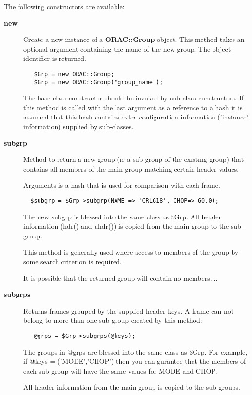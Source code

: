 The following constructors are available:

\begin{description}
\item[\textbf{new}] \mbox{}

Create a new instance of a \textbf{ORAC::Group} object.
This method takes an optional argument containing the
name of the new group. The object identifier is returned.

\begin{verbatim}
   $Grp = new ORAC::Group;
   $Grp = new ORAC::Group("group_name");
\end{verbatim}


The base class constructor should be invoked by sub-class constructors.
If this method is called with the last argument as a reference to
a hash it is assumed that this hash contains extra configuration
information ('instance' information) supplied by sub-classes.

\item[\textbf{subgrp}] \mbox{}

Method to return a new group (ie a sub-group of the existing
group) that contains all members of the main group matching
certain header values.



Arguments is a hash that is used for comparison with each
frame.

\begin{verbatim}
  $subgrp = $Grp->subgrp(NAME => 'CRL618', CHOP=> 60.0);
\end{verbatim}


The new subgrp is blessed into the same class as \$Grp.
All header information (hdr() and uhdr()) is copied 
from the main group to the sub-group.



This method is generally used where access to members of the
group by some search criterion is required.



It is possible that the returned group will contain no 
members....

\item[\textbf{subgrps}] \mbox{}

Returns frames grouped by the supplied header keys.
A frame can not belong to more than one sub group created by this
method:

\begin{verbatim}
   @grps = $Grp->subgrps(@keys);
\end{verbatim}


The groups in @grps are blessed into the same class as \$Grp.
For example, if @keys = ('MODE','CHOP') then you can gurantee
that the members of each sub group will have the same values
for MODE and CHOP.



All header information from the main group is copied to the
sub groups.

\end{description}
